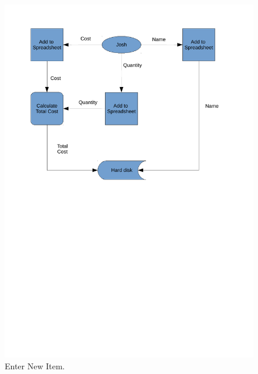 \documentclass[a4paper,12pt]{report}
\begin{document}
\begin{figure}[H]
    \caption{Enter New Item.} \label{fig:print_function_result}
    \includegraphics[width=\textwidth]{./Dataflow/Data_flow_new.pdf}
\end{figure}
\end{document}
